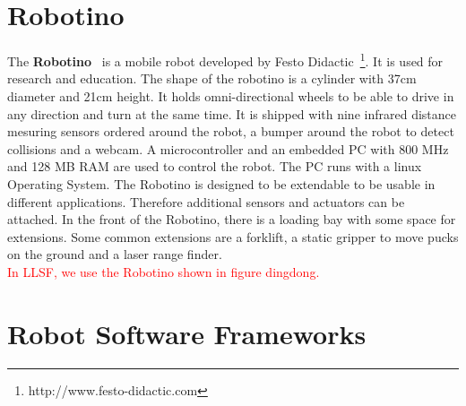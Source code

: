 \section{Robotino}
The \textbf{Robotino}~\cite{Robotino} is a mobile robot developed by Festo Didactic~\footnote{http://www.festo-didactic.com}. It is used for research and education. The shape of the robotino is a cylinder with 37cm diameter and 21cm height. It holds omni-directional wheels to be able to drive in any direction and turn at the same time. It is shipped with nine infrared distance mesuring sensors ordered around the robot, a bumper around the robot to detect collisions and a webcam. A microcontroller and an embedded PC with 800 MHz and 128 MB RAM are used to control the robot. The PC runs with a linux Operating System. The Robotino is designed to be extendable to be usable in different applications. Therefore additional sensors and actuators can be attached. In the front of the Robotino, there is a loading bay with some space for extensions. Some common extensions are a forklift, a static gripper to move pucks on the ground and a laser range finder.\\
\textcolor{red}{In LLSF, we use the Robotino shown in figure dingdong.}


\section{Robot Software Frameworks}
